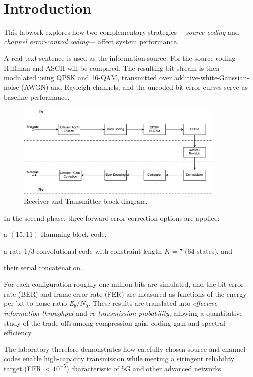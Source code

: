 \section{Introduction}

This labwork explores how two complementary strategies—
\emph{source coding} and \emph{channel error-control coding}—
affect system performance.

A real text sentence is used as the information source.
For the source coding Huffman and ASCII will be compared.
The resulting bit stream is then modulated using QPSK and 16-QAM,
transmitted over additive-white-Gaussian-noise (AWGN) and Rayleigh channels,
and the uncoded bit-error curves serve as baseline performance.

\begin{figure}[H]
  \centering
  \includegraphics[width=0.9\textwidth]{Images/BlockDiagram.png}
  \caption{Receiver and Transmitter block diagram.}
  \label{fig:RxTx}
\end{figure}

In the second phase, three forward-error-correction options are applied:  
\begin{enumerate*}[label=(\roman*)]
  \item a $(15,11)$ Hamming block code,
  \item a rate-$1/3$ convolutional code with constraint length $K=7$ (64 states), and
  \item their serial concatenation.
\end{enumerate*}

For each configuration roughly one million bits are simulated, and the
bit-error rate (BER) and frame-error rate (FER) are measured as functions
of the energy-per-bit to noise ratio $E_b/N_0$.  
These results are translated into \emph{effective information throughput}
and \emph{re-transmission probability}, allowing a quantitative study of
the trade-offs among compression gain, coding gain and spectral efficiency.

The laboratory therefore demonstrates how carefully chosen source and
channel codes enable high-capacity transmission while meeting a stringent
reliability target (FER $<10^{-5}$) characteristic of 5G and other
advanced networks.

